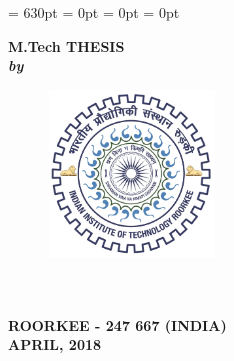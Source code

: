 \begin{titlepage}
\renewcommand{\baselinestretch}{1.5}
  \setlength{\parindent}{0pt}
\textheight = 630pt \topmargin=0pt \voffset=1cm \headheight = 0pt
\marginparwidth= 0pt \headsep = 0pt
\pagestyle{empty}

\begin{center}
\renewcommand{\baselinestretch}{1.2}
\thispagestyle{empty}
\vspace{-10pt}

{\Large \bfseries {\ttitle}\par}\vspace{0.4cm} %

\begingroup
    \fontsize{12pt}{12pt} \selectfont
    \bfseries
\vspace{2.5cm}
\textbf{M.Tech THESIS}\\\vspace{1.5cm}
{\normalsize\textbf{\textit{by}}}\\\vspace{1.5cm}
{\normalsize\textbf{\authorname}}
\endgroup

\vspace{3.5cm}
\begin{figure}[h]
  \centering
  \includegraphics[width=1.75in, height=1.75in]{formalities/logo.jpg}
\end{figure}
\renewcommand{\baselinestretch}{1.2}
\vspace{2.3cm}
\begingroup
    \fontsize{14pt}{12pt} \selectfont
    \bfseries
\deptname\\
\univname\\
ROORKEE - 247 667 (INDIA)\\
APRIL, 2018  
\endgroup
\end{center}

\end{titlepage}